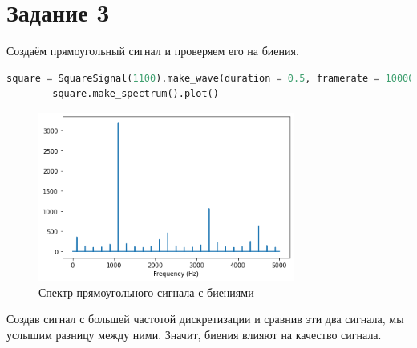 \documentclass[a4paper, 12pt]{report}
\begin{document}
	\section{Задание 3}
	Создаём прямоугольный сигнал и проверяем его на биения.
	\begin{lstlisting}[language=Python,caption=Построение прямоугольного сигнала]
		square = SquareSignal(1100).make_wave(duration = 0.5, framerate = 10000)
		square.make_spectrum().plot()
	\end{lstlisting}
	\begin{figure}[H]
		\centering
		\includegraphics[width=0.75\textwidth]{spectrum2.png}
		\caption{Спектр прямоугольного сигнала с биениями}
		\label{fig:spectrum2}
	\end{figure}
	Создав сигнал с большей частотой дискретизации и сравнив эти два сигнала, мы услышим разницу между ними. Значит, биения влияют на качество сигнала.
	
\end{document}
